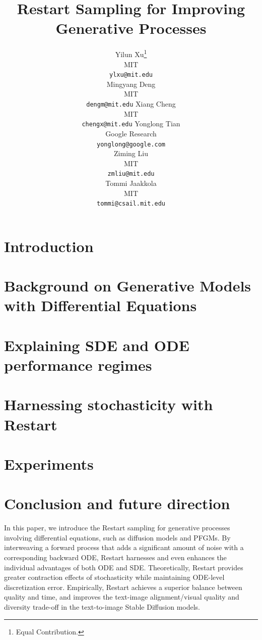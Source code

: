 \documentclass{article}
\title{Restart Sampling for Improving Generative Processes}
\author{Yilun Xu\thanks{Equal Contribution.}\\
MIT\\
\texttt{ylxu@mit.edu}\\
\And
Mingyang Deng\footnotemark[1]\\
MIT\\
\texttt{dengm@mit.edu}
\And
Xiang Cheng\footnotemark[1]\\
MIT\\
\texttt{chengx@mit.edu}
  \And
  Yonglong Tian \\
  Google Research \\
  \texttt{yonglong@google.com} \\
  \AND
  Ziming Liu \\
  MIT \\
  \texttt{zmliu@mit.edu} \\
  \And
  Tommi Jaakkola \\
  MIT \\
  \texttt{tommi@csail.mit.edu}
}
\begin{document}
\maketitle


\begin{abstract}

\end{abstract}

\section{Introduction}


\vspace{-3pt}
\section{Background on Generative Models with Differential Equations}
\vspace{-3pt}


\section{Explaining SDE and ODE performance regimes}
\label{sec:dilemma}


\section{Harnessing stochasticity with Restart}



%

\section{Experiments}
\label{sec:exp}



\vspace{-2pt}
\section{Conclusion and future direction}
\label{sec:conclusion}
\vspace{-1pt}

In this paper, we introduce the Restart sampling for generative processes involving differential equations, such as diffusion models and PFGMs. By interweaving a forward process that adds a significant amount of noise with a corresponding backward ODE, Restart harnesses and even enhances the individual advantages of both ODE and SDE. Theoretically, Restart provides greater contraction effects of stochasticity while maintaining ODE-level discretization error. Empirically, Restart achieves a superior balance between quality and time, and improves the text-image alignment/visual quality and diversity trade-off in the text-to-image Stable Diffusion models.
\end{document}
